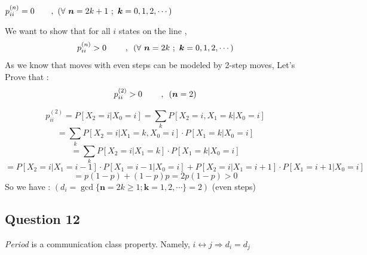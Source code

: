 \documentclass[a4paper]{article}
\begin{document}
		\begin{center}
			$p^{(n)}_{ii} = 0 \hspace{0.7cm} ,\,\, (\forall \,\, {\boldsymbol{n}} = 2k+1 \,\,;\,\, {\boldsymbol{k}} = 0, 1, 2, \cdots)$
		\end{center}
	
	We want to show that for all {\boldmath$i$} states on the line , \[p^{(n)}_{ii} > 0 \hspace{.8cm}, \,\,\, (\forall \,\, {\boldsymbol{n}} = 2k \,\,;\,\, {\boldsymbol{k}} = 0, 1, 2, \cdots)\]
	As we know that moves with even steps can be modeled by 2-step moves, Let's Prove that :
	\[p^{(2)}_{ii} > 0 \hspace{.8cm}, \,\,\, ({\boldsymbol{n}} = 2)\]
	
	
		\[p^{(2)}_{ii} = P[X_2=i | X_0 = i] = \sum_{k}P[X_2=i, X_1 = k | X_0 = i] \]
		\[= \sum_{k}P[X_2=i | X_1 = k , X_0 = i]\cdot P[X_1 =k | X_0 = i]\]
		\[= \sum_{k}P[X_2=i | X_1 = k]\cdot P[X_1 =k | X_0 = i]\]
		\[= P[X_2=i | X_1 = i-1]\cdot P[X_1 =i-1 | X_0 = i] + P[X_2=i | X_1 = i+1]\cdot P[X_1 =i+1 | X_0 = i]\]
		\[= p(1-p) + (1-p)p = 2p(1-p) > 0\]
	So we have : \hspace{1cm} $( d_i = \gcd \{{\boldsymbol{n}} = 2k \geq 1 ; {\boldsymbol{k}} = 1, 2, \cdots\} = 2)$ \hspace{0.6cm} (even steps)
	
	\subsection{{\Large Question 12}}
		\emph{Period} is a communication class property. Namely, $i \leftrightarrow j \Longrightarrow d_i = d_j$
		
\end{document}
